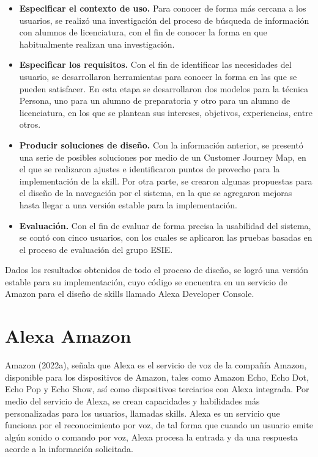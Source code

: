 \begin{itemize}
  \item \textbf{Especificar el contexto de uso.} Para conocer de forma más cercana a los usuarios, se realizó una investigación del proceso de búsqueda de información con alumnos de licenciatura, con el fin de conocer la forma en que habitualmente realizan una investigación.
  \item \textbf{Especificar los requisitos.} Con el fin de identificar las necesidades del usuario, se desarrollaron herramientas para conocer la forma en las que se pueden satisfacer. En esta etapa se desarrollaron dos modelos para la técnica Persona, uno para un alumno de preparatoria y otro para un alumno de licenciatura, en los que se plantean sus intereses, objetivos, experiencias, entre otros.
  \item \textbf{Producir soluciones de diseño.} Con la información anterior, se presentó una serie de posibles soluciones por medio de un Customer Journey Map, en el que se realizaron ajustes e identificaron puntos de provecho para la implementación de la skill. Por otra parte, se crearon algunas propuestas para el diseño de la navegación por el sistema, en la que se agregaron mejoras hasta llegar a una versión estable para la implementación.  
  \item \textbf{Evaluación.} Con el fin de evaluar de forma precisa la usabilidad del sistema, se contó con cinco usuarios, con los cuales se aplicaron las pruebas basadas en el proceso de evaluación del grupo ESIE.
\end{itemize}

Dados los resultados obtenidos de todo el proceso de diseño, se logró una versión estable para su implementación, cuyo código se encuentra en un servicio de Amazon para el diseño de skills llamado Alexa Developer Console.


\section{Alexa Amazon}
\label{AlexacapIV}

Amazon (2022a), señala que Alexa es el servicio de voz de la compañía Amazon, disponible para los dispositivos de Amazon, tales como Amazon Echo, Echo Dot, Echo Pop y Echo Show, así como dispositivos terciarios con Alexa integrada. Por medio del servicio de Alexa, se crean capacidades y habilidades más personalizadas para los usuarios, llamadas skills. Alexa es un servicio que funciona por el reconocimiento por voz, de tal forma que cuando un usuario emite algún sonido o comando por voz, Alexa procesa la entrada y da una respuesta acorde a la información solicitada.

